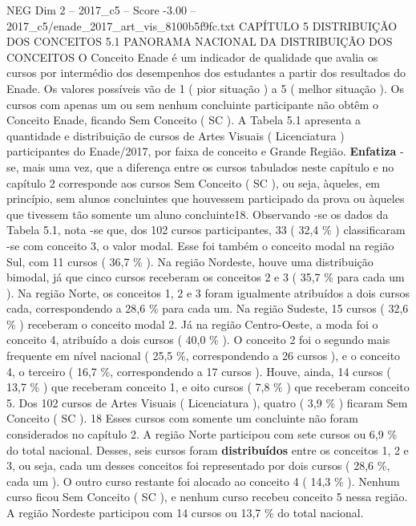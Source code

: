 \begin{textsample}{NEG Dim 2 – 2017\_c5 – Score -3.00 – 2017\_c5/enade\_2017\_art\_vis\_8100b5f9fc.txt}  \label{ex:f2_neg_049}
CAPÍTULO 5 DISTRIBUIÇÃO DOS CONCEITOS 5.1 PANORAMA NACIONAL DA DISTRIBUIÇÃO DOS CONCEITOS O Conceito Enade é um indicador de qualidade que avalia os cursos por intermédio dos desempenhos dos estudantes a partir dos resultados do Enade.
Os valores possíveis vão de 1 ( pior situação ) a 5 ( melhor situação ).
Os cursos com apenas um ou sem nenhum concluinte participante não obtêm o Conceito Enade, ficando Sem Conceito ( SC ).
A Tabela 5.1 apresenta a quantidade e distribuição de cursos de Artes Visuais ( Licenciatura ) participantes do Enade/2017, por faixa de conceito e Grande Região. \textbf{Enfatiza} -se, mais uma vez, que a diferença entre os cursos tabulados neste capítulo e no capítulo 2 corresponde aos cursos Sem Conceito ( SC ), ou seja, àqueles, em princípio, sem alunos concluintes que houvessem participado da prova ou àqueles que tivessem tão somente um aluno concluinte18.
Observando -se os dados da Tabela 5.1, nota -se que, dos 102 cursos participantes, 33 ( 32,4 \% ) classificaram -se com conceito 3, o valor modal.
Esse foi também o conceito modal na região Sul, com 11 cursos ( 36,7 \% ).
Na região Nordeste, houve uma distribuição bimodal, já que cinco cursos receberam os conceitos 2 e 3 ( 35,7 \% para cada um ).
Na região Norte, os conceitos 1, 2 e 3 foram igualmente atribuídos a dois cursos cada, correspondendo a 28,6 \% para cada um.
Na região Sudeste, 15 cursos ( 32,6 \% ) receberam o conceito modal 2.
Já na região Centro-Oeste, a moda foi o conceito 4, atribuído a dois cursos ( 40,0 \% ).
O conceito 2 foi o segundo mais frequente em nível nacional ( 25,5 \%, correspondendo a 26 cursos ), e o conceito 4, o terceiro ( 16,7 \%, correspondendo a 17 cursos ).
Houve, ainda, 14 cursos ( 13,7 \% ) que receberam conceito 1, e oito cursos ( 7,8 \% ) que receberam conceito 5.
Dos 102 cursos de Artes Visuais ( Licenciatura ), quatro ( 3,9 \% ) ficaram Sem Conceito ( SC ). 18 Esses cursos com somente um concluinte não foram considerados no capítulo 2.
A região Norte participou com sete cursos ou 6,9 \% do total nacional.
Desses, seis cursos foram \textbf{distribuídos} entre os conceitos 1, 2 e 3, ou seja, cada um desses conceitos foi representado por dois cursos ( 28,6 \%, cada um ).
O outro curso restante foi alocado ao conceito 4 ( 14,3 \% ).
Nenhum curso ficou Sem Conceito ( SC ), e nenhum curso recebeu conceito 5 nessa região.
A região Nordeste participou com 14 cursos ou 13,7 \% do total nacional.

\end{textsample}
